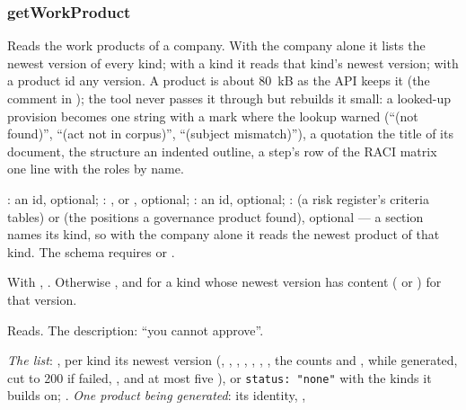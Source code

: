 \subsubsection{getWorkProduct}\label{sec:tools:getWorkProduct}
\begin{description}[style=multiline, leftmargin=19mm, labelwidth=17mm, labelsep=2mm,
  font=\sffamily\bfseries\footnotesize\color{ink}, itemsep=1pt, topsep=2pt, before=\raggedright]
  \item[Does] Reads the work products of a company. With the company alone it lists the
    newest version of every kind; with a kind it reads that kind's newest version; with a
    product id any version. A product is about 80~kB as the API keeps it (the comment in
    ); the tool never passes it through but rebuilds it small:
    a looked-up provision becomes one string with a mark where the lookup warned
    (\enquote{(not found)}, \enquote{(act not in corpus)}, \enquote{(subject mismatch)}), a
    quotation the title of its document, the structure an indented outline, a step's row of the
    RACI matrix one line with the roles by name.
  \item[Input] : an id, optional; : ,
     or , optional; : an id, optional;
    :  (a risk register's criteria tables) or 
    (the positions a governance product found), optional --- a section names its kind, so
    with the company alone it reads the newest product of that kind. The schema requires
     or .
  \item[Calls] With , . Otherwise
    , and for a kind whose newest version has content
    ( or )  for that version.
  \item[Kind] Reads. The description: \enquote{you cannot approve}.
  \item[Returns] \emph{The list}: , per kind its newest version (,
    , , , , ,
    , the counts  and ,  while
    generated,  cut to 200 if failed, , and at most five
    ), or \texttt{status: "none"} with the kinds it builds on;
    . \emph{One product being generated}: its identity, ,

\end{description}
